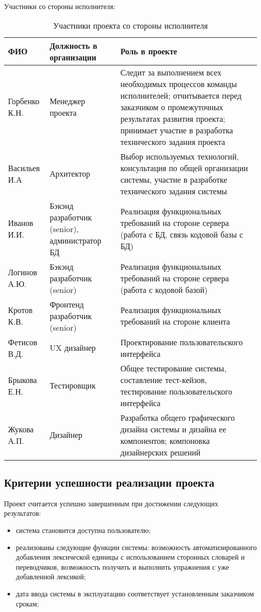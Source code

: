 \documentclass[a4paper,14pt]{extarticle}
\begin{document}
Участники со стороны исполнителя:
\begin{table}[H]
    \caption{Участники проекта со стороны исполнителя}
    \begin{tabular}{ | p{4cm} | p{5cm} | p{7cm} | }
        \hline
        ФИО & Должность в организации & Роль в проекте \\ \hline
        Горбенко К.Н. & Менеджер проекта & Следит за выполнением всех необходимых процессов команды исполнителей; отчитывается перед заказчиком о промежуточных результатах развития проекта; принимает участие в разработка технического задания проекта \\ \hline
        Васильев И.А & Архитектор & Выбор используемых технологий, консультация по общей организации системы, участие в разработке технического задания системы \\ \hline
        Иванов И.И. & Бэкэнд разработчик (senior), администратор БД & Реализация функциональных требований на стороне сервера (работа с БД, связь кодовой базы с БД) \\ \hline
        Логинов А.Ю. & Бэкэнд разработчик (senior) & Реализация функциональных требований на стороне сервера (работа с кодовой базой) \\ \hline
        Кротов К.В. & Фронтенд разработчик (senior) & Реализация функциональных требований на стороне клиента \\ \hline
        Фетисов В.Д. & UX дизайнер & Проектирование пользовательского интерфейса \\ \hline
        Брыкова Е.Н. & Тестировщик & Общее тестирование системы, составление тест-кейзов, тестирование пользовательского интерфейса \\ \hline
        Жукова А.П. & Дизайнер & Разработка общего графического дизайна системы и дизайна ее компонентов; компоновка дизайнерских решений \\ \hline
    \end{tabular}
\end{table}

\subsection{Критерии успешности реализации проекта}
Проект считается успешно завершенным при достижении следующих результатов:
\begin{itemize}
    \item система становится доступна пользователю;
    \item реализованы следующие функции системы: возможность автоматизированного
          добавления лексической единицы с использованием сторонных словарей и
          переводчиков, возможность получить и выполнить упражнения с уже
          добавленной лексикой;
    \item дата ввода системы в эксплуатацию соответствует установленным
          заказчиком срокам;
\end{itemize}
\end{document}
